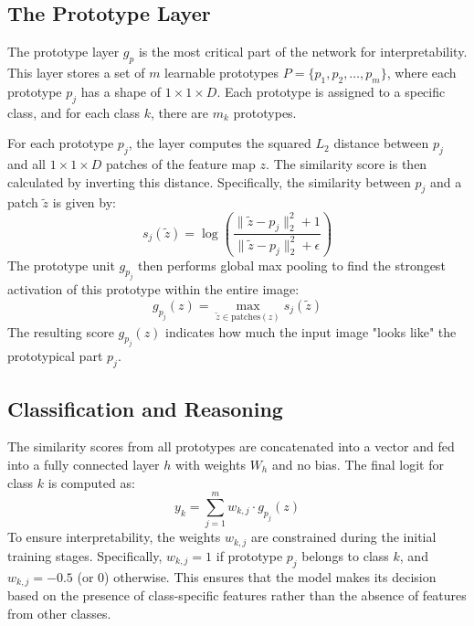 \documentclass[conference]{IEEEtran}
\begin{document}
\subsection{The Prototype Layer}
The prototype layer $g_p$ is the most critical part of the network for interpretability. This layer stores a set of $m$ learnable prototypes $P = \{p_1, p_2, \dots, p_m\}$, where each prototype $p_j$ has a shape of $1 \times 1 \times D$. Each prototype is assigned to a specific class, and for each class $k$, there are $m_k$ prototypes.

For each prototype $p_j$, the layer computes the squared $L_2$ distance between $p_j$ and all $1 \times 1 \times D$ patches of the feature map $z$. The similarity score is then calculated by inverting this distance. Specifically, the similarity between $p_j$ and a patch $\tilde{z}$ is given by:
\begin{equation}
    s_j(\tilde{z}) = \log \left( \frac{\|\tilde{z} - p_j\|_2^2 + 1}{\|\tilde{z} - p_j\|_2^2 + \epsilon} \right)
\end{equation}
The prototype unit $g_{p_j}$ then performs global max pooling to find the strongest activation of this prototype within the entire image:
\begin{equation}
    g_{p_j}(z) = \max_{\tilde{z} \in \text{patches}(z)} s_j(\tilde{z})
\end{equation}
The resulting score $g_{p_j}(z)$ indicates how much the input image "looks like" the prototypical part $p_j$.

\subsection{Classification and Reasoning}
The similarity scores from all prototypes are concatenated into a vector and fed into a fully connected layer $h$ with weights $W_h$ and no bias. The final logit for class $k$ is computed as:
\begin{equation}
    y_k = \sum_{j=1}^m w_{k,j} \cdot g_{p_j}(z)
\end{equation}
To ensure interpretability, the weights $w_{k,j}$ are constrained during the initial training stages. Specifically, $w_{k,j} = 1$ if prototype $p_j$ belongs to class $k$, and $w_{k,j} = -0.5$ (or 0) otherwise. This ensures that the model makes its decision based on the presence of class-specific features rather than the absence of features from other classes.
\end{document}
